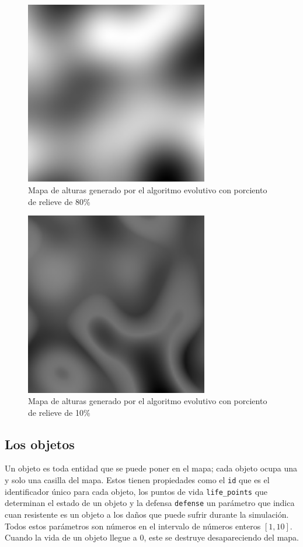 \begin{figure}
	\centering
	\includegraphics[width=8cm]{chapters/img/map80.png}
	\caption{Mapa de alturas generado por el algoritmo evolutivo con porciento de relieve de 80\%}
\end{figure}

\begin{figure}
	\centering
	\includegraphics[width=8cm]{chapters/img/map10.png}
	\caption{Mapa de alturas generado por el algoritmo evolutivo con porciento de relieve de 10\%}
\end{figure}


\subsection{Los objetos}

Un objeto es toda entidad que se puede poner en el mapa; cada objeto ocupa una y solo una casilla del mapa. Estos tienen propiedades como el \verb|id| que es el identificador único para cada objeto, los puntos de vida \verb|life_points| que determinan el estado de un objeto y la defensa \verb|defense| un parámetro que indica cuan resistente es un objeto a los daños que puede sufrir durante la simulación. Todos estos parámetros son números en el intervalo de números enteros $[1,10]$. Cuando la vida de un objeto llegue a 0, este se destruye desapareciendo del mapa. 

